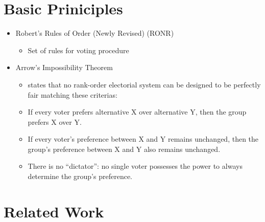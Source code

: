 \documentclass[conference]{IEEEtran}
\begin{document}
\section{Basic Priniciples}\label{2BasicPrinciples}
\begin{itemize}
    \item Robert's Rules of Order (Newly Revised) (RONR)
    \begin{itemize}
        \item Set of rules for voting procedure
    \end{itemize}
    \item Arrow's Impossibility Theorem
    \begin{itemize}
        \item states that no rank-order electorial system can be designed to be perfectly fair matching these criterias:
        \item If every voter prefers alternative X over alternative Y, then the group prefers X over Y.
        \item If every voter’s preference between X and Y remains unchanged, then the group’s preference between X and Y also remains unchanged.
        \item There is no “dictator”: no single voter possesses the power to always determine the group’s preference.
    \end{itemize}
\end{itemize}

\section{Related Work}\label{3RelatedWork}




\vspace{12pt}
\end{document}
